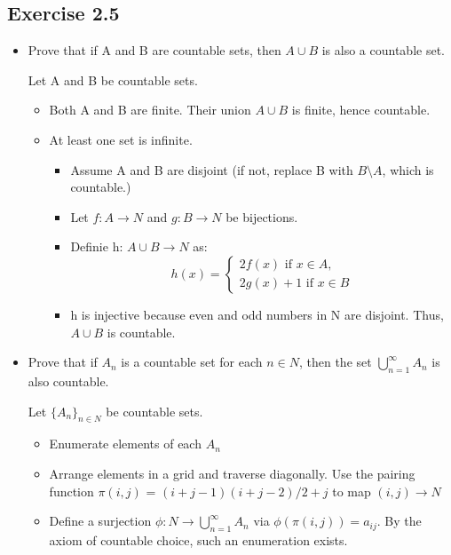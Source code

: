 \documentclass[12pt]{article}
\begin{document}
		\subsection*{Exercise 2.5}
			\begin{itemize}
				\item Prove that if A and B are countable sets, then $A \cup B$ is also a countable set.
				
					Let A and B be countable sets.
					\begin{itemize}
						\item Both A and B are finite. Their union $A \cup B$ is finite, hence countable.
						\item At least one set is infinite.
						\begin{itemize}
							\item Assume A and B are disjoint (if not, replace B with $B \setminus A$, which is countable.)
							\item Let $f:A \rightarrow N$ and $g:B \rightarrow N$ be bijections.
							\item Definie h: $A \cup B \rightarrow N$ as:
								\begin{equation}
									h(x) = \left\{
									\begin{aligned}
										2f(x) \text{ if } x \in A, \\
										2g(x) + 1 \text{ if }x \in B
									\end{aligned}
									\right.
								\end{equation}
							\item h is injective because even and odd numbers in N are disjoint. Thus, $A \cup B$ is countable.
						\end{itemize}
					\end{itemize}
				\item Prove that if $A_n$ is a countable set for each $n \in N$, then the set $\bigcup_{n=1}^{\infty}A_n$ is also countable.
					
					Let $\{A_n\}_{n \in N}$ be countable sets.
					\begin{itemize}
						\item Enumerate elements of each $A_n$
						\item Arrange elements in a grid and traverse diagonally. Use the pairing function $\pi(i,j)$ = $(i+j-1)(i+j-2)/2 + j$ to map $(i,j) \rightarrow N$
						\item Define a surjection $\phi: N \rightarrow \bigcup_{n=1}^{\infty}A_n$ via $\phi(\pi(i,j)) = a_{ij}$. By the axiom of countable choice, such an enumeration exists.
					\end{itemize}
			\end{itemize}
\end{document}
